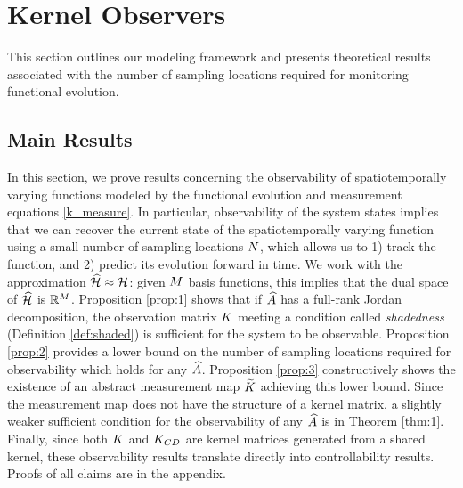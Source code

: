 \vspace{-0.1in}
\section{Kernel Observers}\label{sec:observers}

This section outlines our modeling framework and presents theoretical results associated with the number of sampling locations required for monitoring functional evolution. 

\vspace{-0.1in}


\subsection{Main Results}\label{sec:theory_results}
In this section, we prove results concerning the observability of spatiotemporally varying functions modeled by the functional evolution and measurement equations \eqref{k_measure}. In particular,  observability of the system states implies that we can recover the current state of the spatiotemporally varying function using a small number of sampling locations $N$, which allows us to 1) track the function, and 2) predict its evolution forward in time. We work with the approximation $\widehat{\mathcal{H}}\approx\mathcal{H}$: given $M$ basis functions, this implies that the dual space of $\widehat{\mathcal{H}}$ is $\mathbb{R}^{M}$.
Proposition \ref{prop:1} shows that if $\widehat{A}$ has a full-rank Jordan decomposition, the observation matrix $K$ meeting a condition called \emph{shadedness} (Definition \ref{def:shaded}) is sufficient for the system to be observable. Proposition \ref{prop:2} provides a lower bound on the number of sampling locations required for observability which holds for any $\widehat{A}$.  Proposition \ref{prop:3} constructively shows the existence of an abstract measurement map $\widetilde{K}$ achieving this lower bound. Since the measurement map does not have the structure of a kernel matrix, a slightly weaker sufficient condition for the observability of any $\widehat{A}$ is in Theorem \ref{thm:1}. Finally, since both $K$ and $K_{CD}$ are kernel matrices generated from a shared kernel, these observability results translate directly into controllability results. Proofs of all claims are in the appendix. 

